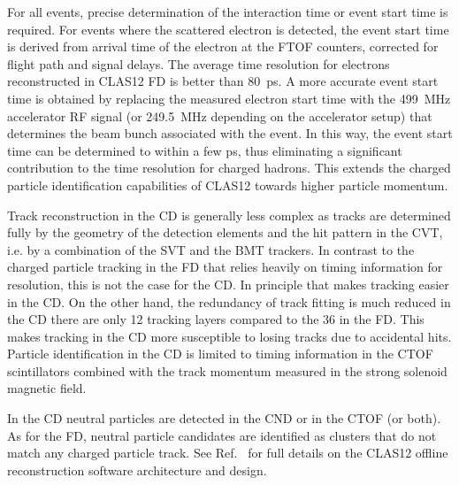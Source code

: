 \documentclass[final,3p,twocolumn]{elsarticle}
\begin{document}
For all events, precise determination of the interaction time or event start time is required. For events where the
scattered electron is detected, the event start time is derived from arrival time of the electron at the FTOF
counters, corrected for flight path and signal delays.  The average time resolution for electrons reconstructed in
CLAS12 FD is better than 80~ps. A more accurate event start time is obtained by replacing the measured electron
start time with the 499~MHz accelerator RF signal (or 249.5~MHz depending on the accelerator setup) that
determines the beam bunch associated with the event. In this way, the event start time can be determined to within
a few ps, thus eliminating a significant contribution to the time resolution for charged hadrons. This extends the
charged particle identification capabilities of CLAS12 towards higher particle momentum.

Track reconstruction in the CD is generally less complex as tracks are determined fully by the geometry of the 
detection elements and the hit pattern in the CVT, i.e. by a combination of the SVT and the BMT trackers.  In contrast
to the charged particle tracking in the FD that relies heavily on timing information for resolution, this is not the case
for the CD. In principle that makes tracking easier in the CD. On the other hand, the redundancy of track fitting is
much reduced in the CD there are only 12 tracking layers compared to the 36 in the FD. This makes tracking in the
CD more susceptible to losing tracks due to accidental hits. Particle identification in the CD is limited to timing
information in the CTOF scintillators combined with the track momentum measured in the strong solenoid magnetic
field.

In the CD neutral particles are detected in the CND or in the CTOF (or both). As for the FD, neutral particle
candidates are identified as clusters that do not match any charged particle track. See Ref.~\cite{Software} for
full details on the CLAS12 offline reconstruction software architecture and design.
\end{document}
